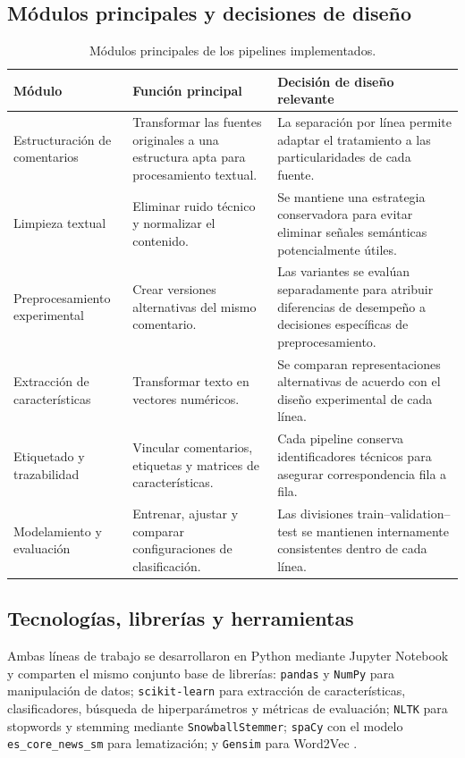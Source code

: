 \documentclass[12pt,a4paper]{article}
\newcommand{\code}[1]{\nolinkurl{#1}}
\begin{document}
\subsection{Módulos principales y decisiones de diseño}

\begin{table}[htbp]
\centering
\caption{Módulos principales de los pipelines implementados.}
\label{tab:modulos}
\small
\begin{tabularx}{\textwidth}{@{}P{3.2cm}P{4.2cm}Y@{}}
\toprule
\textbf{Módulo} & \textbf{Función principal} & \textbf{Decisión de diseño relevante} \\
\midrule
Estructuración de comentarios & Transformar las fuentes originales a una estructura apta para procesamiento textual. & La separación por línea permite adaptar el tratamiento a las particularidades de cada fuente. \\
\addlinespace
Limpieza textual & Eliminar ruido técnico y normalizar el contenido. & Se mantiene una estrategia conservadora para evitar eliminar señales semánticas potencialmente útiles. \\
\addlinespace
Preprocesamiento experimental & Crear versiones alternativas del mismo comentario. & Las variantes se evalúan separadamente para atribuir diferencias de desempeño a decisiones específicas de preprocesamiento. \\
\addlinespace
Extracción de características & Transformar texto en vectores numéricos. & Se comparan representaciones alternativas de acuerdo con el diseño experimental de cada línea. \\
\addlinespace
Etiquetado y trazabilidad & Vincular comentarios, etiquetas y matrices de características. & Cada pipeline conserva identificadores técnicos para asegurar correspondencia fila a fila. \\
\addlinespace
Modelamiento y evaluación & Entrenar, ajustar y comparar configuraciones de clasificación. & Las divisiones train--validation--test se mantienen internamente consistentes dentro de cada línea. \\
\bottomrule
\end{tabularx}
\end{table}
\FloatBarrier

\subsection{Tecnologías, librerías y herramientas}

Ambas líneas de trabajo se desarrollaron en Python mediante Jupyter Notebook y comparten el mismo conjunto base de librerías: \code{pandas} y \code{NumPy} para manipulación de datos; \code{scikit-learn} para extracción de características, clasificadores, búsqueda de hiperparámetros y métricas de evaluación; \code{NLTK} para stopwords y stemming mediante \code{SnowballStemmer}; \code{spaCy} con el modelo \code{es\_core\_news\_sm} para lematización; y \code{Gensim} para Word2Vec \cite{sklearn}.
\end{document}
